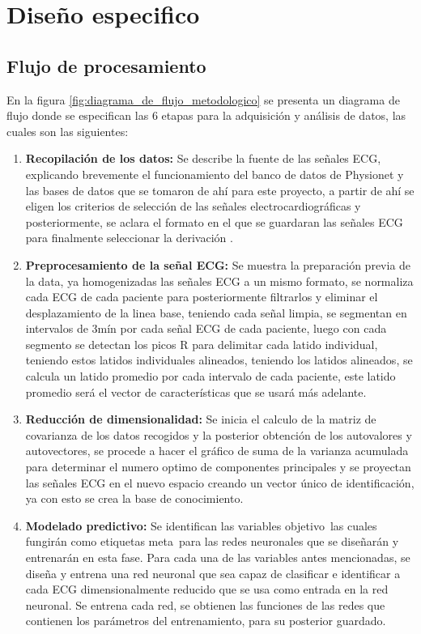 \documentclass[12pt,letterpaper,oneside,openright]{book}
\begin{document}
\section{Diseño especifico}
\subsection{Flujo de procesamiento}

En la figura \ref{fig:diagrama_de_flujo_metodologico} se presenta un diagrama de flujo donde se especifican las 6 etapas para la adquisición y análisis de datos, las cuales son las siguientes:
\begin{enumerate}[label=\textbf{\Roman*.}]
	\item \textbf{Recopilación de los datos:} Se describe la fuente de las señales ECG, explicando brevemente el funcionamiento del banco de datos de Physionet y las bases de datos que se tomaron de ahí para este proyecto, a partir de ahí se eligen los criterios de selección de las señales electrocardiográficas y posteriormente, se aclara el formato en el que se guardaran las señales ECG para finalmente seleccionar la derivación .
	\item \textbf{Preprocesamiento de la señal ECG:} Se muestra la preparación previa de la data, ya homogenizadas las señales ECG a un mismo formato, se normaliza cada ECG de cada paciente para posteriormente filtrarlos y eliminar el desplazamiento de la linea base, teniendo cada señal limpia, se segmentan en intervalos de 3mín por cada señal ECG de cada paciente, luego con cada segmento se detectan los picos R para delimitar cada latido individual, teniendo estos latidos individuales alineados, teniendo los latidos alineados, se calcula un latido promedio por cada intervalo de cada paciente, este latido promedio será el vector de características que se usará más adelante.
	\item \textbf{Reducción de dimensionalidad:} Se inicia el calculo de la matriz de covarianza de los datos recogidos y la posterior obtención de los autovalores y autovectores, se procede a hacer el gráfico de suma de la varianza acumulada para determinar el numero optimo de componentes principales y se proyectan las señales ECG en el nuevo espacio creando un vector único de identificación, ya con esto se crea la base de conocimiento.
	\item \textbf{Modelado predictivo:} Se identifican las \guillemetleft variables objetivo\guillemetright \ las cuales fungirán como etiquetas \guillemetleft meta\guillemetright \ para las redes neuronales que se diseñarán y entrenarán en esta fase. Para cada una de las variables antes mencionadas, se diseña y entrena una red neuronal que sea capaz de clasificar e identificar a cada ECG dimensionalmente reducido que se usa como entrada en la red neuronal. Se entrena cada red, se obtienen las funciones de las redes que contienen los parámetros del entrenamiento, para su posterior guardado.

\end{enumerate}
\end{document}

